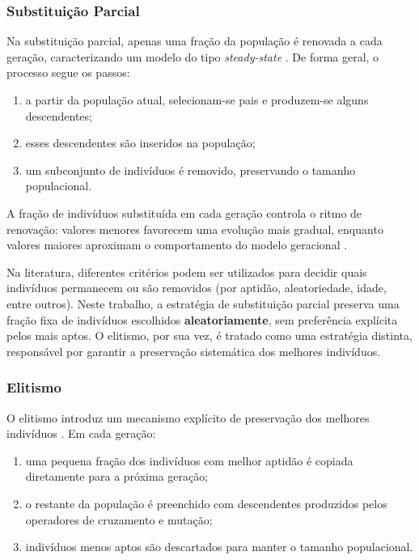 \subsubsection{Substituição Parcial}

Na substituição parcial, apenas uma fração da população é renovada a cada geração, caracterizando um modelo do tipo \textit{steady-state} \cite{eiben2015introduction,whitley1994tutorial}. De forma geral, o processo segue os passos:

\begin{enumerate}
    \item a partir da população atual, selecionam-se pais e produzem-se alguns descendentes;
    \item esses descendentes são inseridos na população;
    \item um subconjunto de indivíduos é removido, preservando o tamanho populacional.
\end{enumerate}

A fração de indivíduos substituída em cada geração controla o ritmo de renovação: valores menores favorecem uma evolução mais gradual, enquanto valores maiores aproximam o comportamento do modelo geracional \cite{goldberg1989genetic,mitchell1998introduction}.  

Na literatura, diferentes critérios podem ser utilizados para decidir quais indivíduos permanecem ou são removidos (por aptidão, aleatoriedade, idade, entre outros). Neste trabalho, a estratégia de substituição parcial preserva uma fração fixa de indivíduos escolhidos \textbf{aleatoriamente}, sem preferência explícita pelos mais aptos. O elitismo, por sua vez, é tratado como uma estratégia distinta, responsável por garantir a preservação sistemática dos melhores indivíduos.

\subsubsection{Elitismo}

O elitismo introduz um mecanismo explícito de preservação dos melhores indivíduos \cite{goldberg1989genetic,whitley1994tutorial}. Em cada geração:

\begin{enumerate}
    \item uma pequena fração dos indivíduos com melhor aptidão é copiada diretamente para a próxima geração;
    \item o restante da população é preenchido com descendentes produzidos pelos operadores de cruzamento e mutação;
    \item indivíduos menos aptos são descartados para manter o tamanho populacional.
\end{enumerate}

